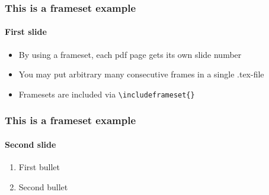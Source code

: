 \begin{frame}
\frametitle{This is a frameset example}
\framesubtitle{First slide}
\begin{itemize}
  \item By using a frameset, each pdf page gets its own slide number
  \item You may put arbitrary many consecutive frames in a single .tex-file
  \item Framesets are included via \texttt{\textbackslash includeframeset\{\}}
\end{itemize}
\end{frame}

\begin{frame}
\frametitle{This is a frameset example}
\framesubtitle{Second slide}
\begin{enumerate}
  \item First bullet
  \item Second bullet
\end{enumerate}
\end{frame}
